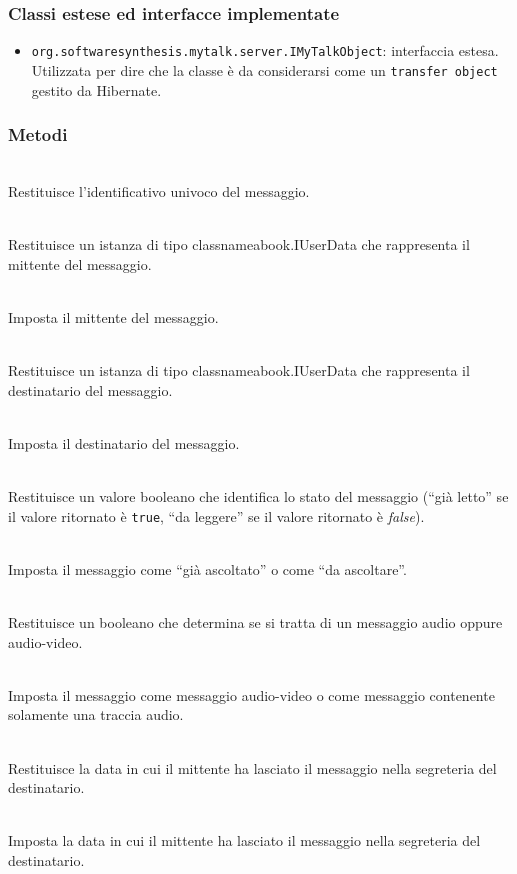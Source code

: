 \subsubsection*{Classi estese ed interfacce implementate}

\begin{itemize}
	\item \texttt{org.softwaresynthesis.mytalk.server.IMyTalkObject}: interfaccia estesa. Utilizzata per dire che la classe è da considerarsi come un \texttt{transfer object} gestito da Hibernate.
\end{itemize}

\subsubsection*{Metodi}
\begin{description}
	\item{}\\
	Restituisce l'identificativo univoco del messaggio.
	\item{}\\
	Restituisce un istanza di tipo classname{abook.IUserData} che rappresenta il mittente del messaggio.
	\item{}\\
	Imposta il mittente del messaggio.
	\item{}\\
	Restituisce un istanza di tipo classname{abook.IUserData} che rappresenta il destinatario del messaggio.
	\item{}\\
	Imposta il destinatario del messaggio.
	\item{}\\
	Restituisce un valore booleano che identifica lo stato del messaggio (``già letto'' se il valore ritornato è \texttt{true}, ``da leggere'' se il valore ritornato è \textit{false}).
	\item{}\\
	Imposta il messaggio come ``già ascoltato'' o come ``da ascoltare''.
	\item{}\\
	Restituisce un booleano che determina se si tratta di un messaggio audio oppure audio-video.
	\item{}\\	
	Imposta il messaggio come messaggio audio-video o come messaggio contenente solamente una traccia audio.
	\item{}\\
	Restituisce la data in cui il mittente ha lasciato il messaggio nella segreteria del destinatario.
	\item{}\\
	Imposta la data in cui il mittente ha lasciato il messaggio nella segreteria del destinatario.
\end{description}

